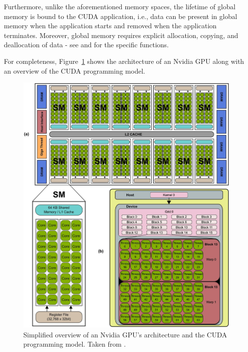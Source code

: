 Furthermore, unlike the aforementioned memory spaces, the lifetime of global memory is bound to the CUDA application, i.e., data can be present in global memory when the application starts and removed when the application terminates.
Moreover, global memory requires explicit allocation, copying, and deallocation of data - see  \cite{Cejka2022} and  \cite{NVIDIADecember2022} for the specific functions.

For completeness, Figure~\ref{Figure:theory->CUDA->memory-management->nvidia-gpu-architecture-and-cuda-structures} shows the architecture of an Nvidia GPU along with an overview of the CUDA programming model.

\begin{figure}[ht!]
	\centering
	\includegraphics[width=\textwidth, keepaspectratio]{images/ch01/nvidia_gpu_architecture_and_cuda_structures.png}
	\caption{Simplified overview of an Nvidia GPU's architecture and the CUDA programming model.
		Taken from  \cite{Hernandez2015}.
	}
	\label{Figure:theory->CUDA->memory-management->nvidia-gpu-architecture-and-cuda-structures}
\end{figure}

